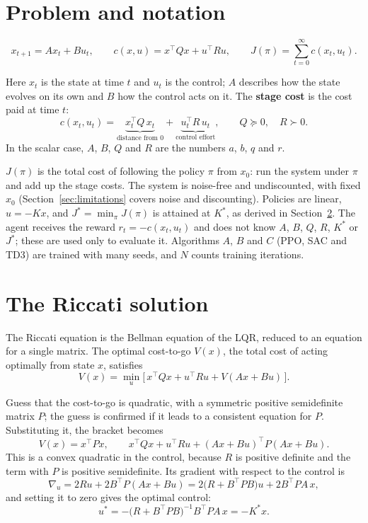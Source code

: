 \documentclass[11pt]{article}
\begin{document}
\section{Problem and notation}
\label{sec:problem}

\[
  x_{t+1} = A x_t + B u_t, \qquad c(x, u) = x^\top Q x + u^\top R u, \qquad
  J(\pi) = \sum_{t=0}^{\infty} c(x_t, u_t).
\]

Here $x_t$ is the state at time $t$ and $u_t$ is the control; $A$ describes how the state evolves on
its own and $B$ how the control acts on it. The \textbf{stage cost} is the cost paid at time $t$:
\[
  c(x_t, u_t) = \underbrace{x_t^\top Q\, x_t}_{\text{distance from } 0}
  + \underbrace{u_t^\top R\, u_t}_{\text{control effort}},
  \qquad Q \succeq 0, \quad R \succ 0 .
\]
In the scalar case, $A$, $B$, $Q$ and $R$ are the numbers $a$, $b$, $q$ and $r$.

$J(\pi)$ is the total cost of following the policy $\pi$ from $x_0$: run the system under $\pi$ and
add up the stage costs. The system is noise-free and undiscounted, with fixed $x_0$
(Section~\ref{sec:limitations} covers noise and discounting). Policies are linear, $u = -Kx$, and
$J^* = \min_\pi J(\pi)$ is attained at $K^*$, as derived in Section~\ref{sec:riccati}. The agent
receives the reward $r_t = -c(x_t, u_t)$ and does not know $A$, $B$, $Q$, $R$, $K^*$ or $J^*$; these
are used only to evaluate it. Algorithms $A$, $B$ and $C$ (PPO, SAC and TD3) are trained with many
seeds, and $N$ counts training iterations.

\section{The Riccati solution}
\label{sec:riccati}

The Riccati equation is the Bellman equation of the LQR, reduced to an equation for a single
matrix. The optimal cost-to-go $V(x)$, the total cost of acting optimally from state $x$, satisfies
\[
  V(x) = \min_u \Big[\, x^\top Q x + u^\top R u + V(A x + B u) \,\Big].
\]

Guess that the cost-to-go is quadratic, with a symmetric positive semidefinite matrix $P$; the guess
is confirmed if it leads to a consistent equation for $P$. Substituting it, the bracket becomes
\[
  V(x) = x^\top P x, \qquad x^\top Q x + u^\top R u + (A x + B u)^\top P (A x + B u).
\]
This is a convex quadratic in the control, because $R$ is positive definite and the term with $P$ is
positive semidefinite. Its gradient with respect to the control is
\[
  \nabla_u = 2 R u + 2 B^\top P (A x + B u) = 2\big(R + B^\top P B\big) u + 2 B^\top P A\, x ,
\]
and setting it to zero gives the optimal control:
\[
  u^* = -\big(R + B^\top P B\big)^{-1} B^\top P A\, x = -K^* x .
\]
\end{document}
